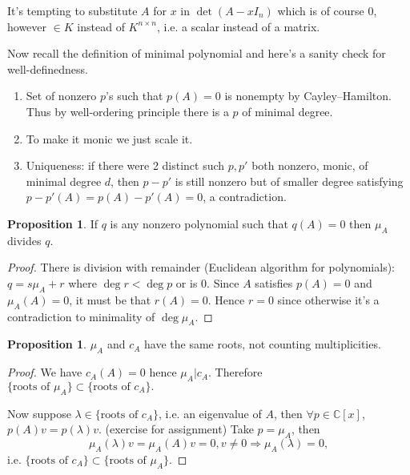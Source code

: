 \documentclass[a4paper]{article}
\theoremstyle{definition}
\newtheorem{prop}[defn]{Proposition}
\begin{document}
It's tempting to substitute $A$ for $x$ in $\det (A-xI_n)$ which is of course $0$, however $\in K$ instead of $K^{n\times n}$, i.e. a scalar instead of a matrix.

Now recall the definition of minimal polynomial and here's a sanity check for well-definedness.

\begin{enumerate}
	\item Set of nonzero $p$'s such that $p(A)=0$ is nonempty by Cayley--Hamilton. Thus by well-ordering principle there is a $p$ of minimal degree.
	\item To make it monic we just scale it.
	\item Uniqueness: if there were 2 distinct such $p,p'$ both nonzero, monic, of minimal degree $d$, then $p-p'$ is still nonzero but of smaller degree satisfying $p-p'(A)=p(A)-p'(A)=0$, a contradiction.
\end{enumerate}

\begin{prop}
	If $q$ is any nonzero polynomial such that $q(A)=0$ then $\mu_{A}$ divides $q$.
\end{prop}

\begin{proof}
	There is division with remainder (Euclidean algorithm for polynomials): $q=s\mu_{A}+r$ where $\deg r < \deg p$ or is 0. Since $A$ satisfies $p(A)=0$ and $\mu_{A}(A)=0$, it must be that $r(A)=0$. Hence $r=0$ since otherwise it's a contradiction to minimality of $\deg \mu_{A}$.
\end{proof}

\begin{prop}
	$\mu_{A}$ and $c_{A}$ have the same roots, not counting multiplicities.
\end{prop}

\begin{proof}
	We have $c_{A}(A)=0$ hence $\mu_{A} | c_{A}$. Therefore $\{\text{roots of }\mu_{A}\} \subset \{\text{roots of }c_{A}\} .$

	Now suppose $\lambda \in \{\text{roots of }c_{A}\}$, i.e. an eigenvalue of $A$, then $\forall p \in \mathbb C [x]$, $p(A)v=p(\lambda )v .$ (exercise for assignment) Take $p=\mu_{A}$, then
\[
\mu_{A}(\lambda) v = \mu_{A}(A)v=0, v\neq 0 \Rightarrow \mu_{A}(\lambda)=0,
\]
i.e. $\{\text{roots of }c_{A}\} \subset \{\text{roots of }\mu_{A}\} .$
\end{proof}
\end{document}
